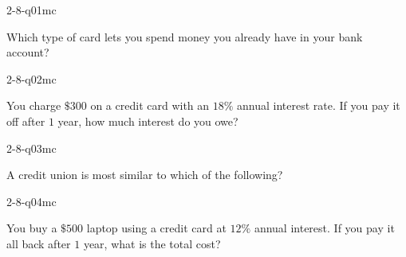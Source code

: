 

\begin{practiceQuestion}{2-8-q01}{mc}
\begin{questionText}
Which type of card lets you spend money you already have in your bank account?
\end{questionText}
\end{practiceQuestion}

\begin{practiceQuestion}{2-8-q02}{mc}
\begin{questionText}
You charge $\$300$ on a credit card with an $18\%$ annual interest rate. If you pay it off after $1$ year, how much interest do you owe?
\end{questionText}
\end{practiceQuestion}

\begin{practiceQuestion}{2-8-q03}{mc}
\begin{questionText}
A credit union is most similar to which of the following?
\end{questionText}
\end{practiceQuestion}

\begin{practiceQuestion}{2-8-q04}{mc}
\begin{questionText}
You buy a $\$500$ laptop using a credit card at $12\%$ annual interest. If you pay it all back after $1$ year, what is the total cost?
\end{questionText}
\end{practiceQuestion}

